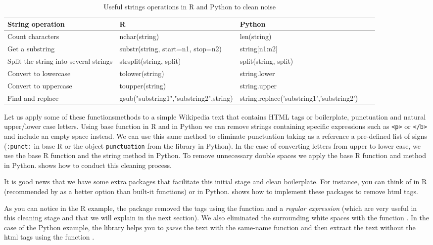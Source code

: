 \begin{table}
  \caption{\label{tab:stringoperations}Useful strings operations in R and Python to clean noise}{
  \begin{tabularx}{\textwidth}{lllll}
    \toprule
String operation      & R   & Python\\ \midrule
Count characters      & nchar(string) & len(string)  \\
Get a substring       & substr(string, start=n1, stop=n2) & string[n1:n2]            \\
Split the string into several strings   & strsplit(string, split) & split(string, split)             \\ 
Convert to lowercase  & tolower(string) & string.lower     \\ 
Convert to uppercase  & toupper(string) & string.upper     \\ 
Find and replace      & gsub("substring1","substring2",string) & string.replace('substring1','substring2') \\ 
    \bottomrule
  \end{tabularx}}{}
\end{table}

Let us apply some of these functions\/methods to a simple Wikipedia text that contains HTML tags or boilerplate, punctuation and natural upper/lower case letters. Using base function  in R and  in Python we can remove strings containing specific expressions such as \texttt{<p>} or \texttt{</b>} and include an empty space instead. We can use this same method to eliminate punctuation taking as a reference a pre-defined list of signs (\texttt{:punct:} in base R or the object \texttt{punctuation} from the library  in Python). In the case of converting letters from upper to lower case, we use the base R function  and the string method  in Python. To remove unnecessary double spaces we apply the base R function  and method  in Python.  shows how to conduct this cleaning process.


It is good news that we have some extra packages that facilitate this initial stage and clean boilerplate. For instance, you can think of  in R (recommended by \citet{welbers2017text} as a better option than built-it functions) or  in Python.  shows how to implement these packages to remove html tags.


As you can notice in the R example, the package  removed the tags using the function  and a \emph{regular expression} (which are very useful in this cleaning stage and that we will explain in the next section). We also eliminated the surrounding white spaces with the function . In the case of the Python example, the library  helps you to \emph{parse} the text with the same-name function  and then extract the text without the html tags using the function .	